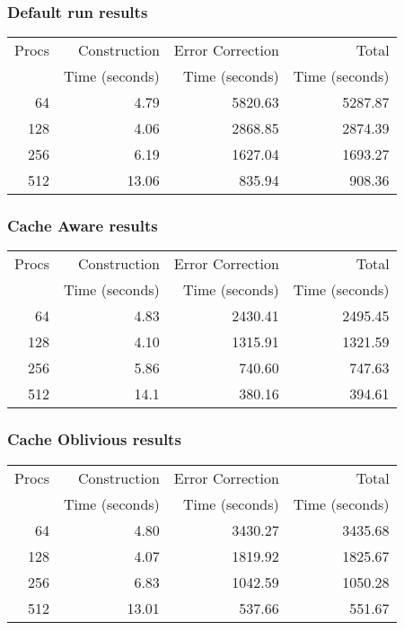 \documentclass[integrals, nointegrals, article, 12pt, a4paper]{article}
\begin{document}
\subsubsection{Default run results}
\label{sec-3-3-2}

\begin{center}
\begin{tabular}{rrrr}
\hline
Procs & Construction & Error Correction & Total\\
 & Time (seconds) & Time (seconds) & Time (seconds)\\
\hline
64 & 4.79 & 5820.63 & 5287.87\\
128 & 4.06 & 2868.85 & 2874.39\\
256 & 6.19 & 1627.04 & 1693.27\\
512 & 13.06 & 835.94 & 908.36\\
\hline
\end{tabular}
\end{center}

\subsubsection{Cache Aware results}
\label{sec-3-3-3}

\begin{center}
\begin{tabular}{rrrr}
\hline
Procs & Construction & Error Correction & Total\\
 & Time (seconds) & Time (seconds) & Time (seconds)\\
\hline
64 & 4.83 & 2430.41 & 2495.45\\
128 & 4.10 & 1315.91 & 1321.59\\
256 & 5.86 & 740.60 & 747.63\\
512 & 14.1 & 380.16 & 394.61\\
\hline
\end{tabular}
\end{center}

\subsubsection{Cache Oblivious results}
\label{sec-3-3-4}

\begin{center}
\begin{tabular}{rrrr}
\hline
Procs & Construction & Error Correction & Total\\
 & Time (seconds) & Time (seconds) & Time (seconds)\\
\hline
64 & 4.80 & 3430.27 & 3435.68\\
128 & 4.07 & 1819.92 & 1825.67\\
256 & 6.83 & 1042.59 & 1050.28\\
512 & 13.01 & 537.66 & 551.67\\
\hline
\end{tabular}
\end{center}
\end{document}
